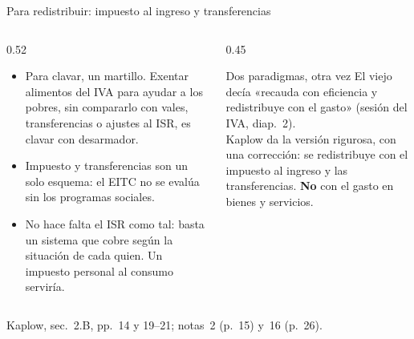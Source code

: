 \documentclass[aspectratio=169,11pt]{beamer}
\newcommand{\fuente}[1]{\par\vfill{\small\color{cGris}#1\par}}
\begin{document}
\begin{frame}{Para redistribuir: impuesto al ingreso y transferencias}
  \begin{columns}[T]
    \begin{column}{0.52\textwidth}
      \begin{itemize}
        \item Para clavar, un martillo. Exentar alimentos del IVA para ayudar a los pobres, sin compararlo con vales, transferencias o ajustes al ISR, es clavar con desarmador.
        \item Impuesto y transferencias son un solo esquema: el EITC no se evalúa sin los programas sociales.
        \item No hace falta el ISR como tal: basta un sistema que cobre según la situación de cada quien. Un impuesto personal al consumo serviría.
      \end{itemize}
    \end{column}
    \begin{column}{0.45\textwidth}
      \pause
      \begin{block}{Dos paradigmas, otra vez}
        El viejo decía «recauda con eficiencia y redistribuye con el gasto» (sesión del IVA, diap.~2).\\[3pt]
        Kaplow da la versión rigurosa, con una corrección: se redistribuye con el impuesto al ingreso y las transferencias. \textbf{No} con el gasto en bienes y servicios.
      \end{block}
    \end{column}
  \end{columns}
  \fuente{Kaplow, sec.~2.B, pp.~14 y 19--21; notas~2 (p.~15) y~16 (p.~26).}
\end{frame}
\end{document}
